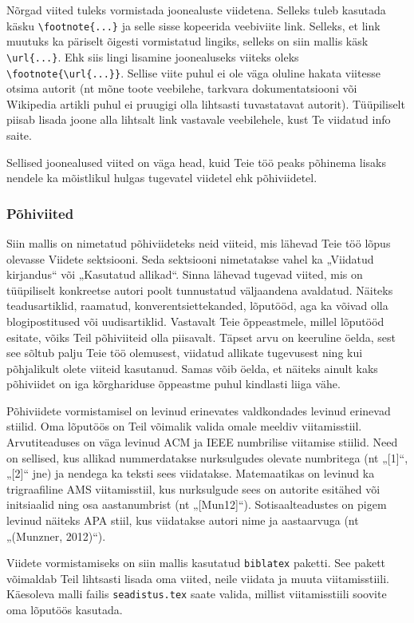 Nõrgad viited tuleks vormistada joonealuste viidetena. Selleks tuleb kasutada käsku \verb|\footnote{...}| ja selle sisse kopeerida veebiviite link. Selleks, et link muutuks ka päriselt õigesti vormistatud lingiks, selleks on siin mallis käsk \verb|\url{...}|. Ehk siis lingi lisamine joonealuseks viiteks oleks \verb|\footnote{\url{...}}|. Sellise viite puhul ei ole väga oluline hakata viitesse otsima autorit (nt mõne toote veebilehe, tarkvara dokumentatsiooni või Wikipedia artikli puhul ei pruugigi olla lihtsasti tuvastatavat autorit). Tüüpiliselt piisab lisada joone alla lihtsalt link vastavale veebilehele, kust Te viidatud info saite.

Sellised joonealused viited on väga head, kuid Teie töö peaks põhinema lisaks nendele ka mõistlikul hulgas tugevatel viidetel ehk põhiviidetel.

\subsubsection{Põhiviited}
Siin mallis on nimetatud põhiviideteks neid viiteid, mis lähevad Teie töö lõpus olevasse Viidete sektsiooni. Seda sektsiooni nimetatakse vahel ka „Viidatud kirjandus“ või „Kasutatud allikad“. Sinna lähevad tugevad viited, mis on tüüpiliselt konkreetse autori poolt tunnustatud väljaandena avaldatud. Näiteks teadusartiklid, raamatud, konverentsiettekanded, lõputööd, aga ka võivad olla blogipostitused või uudisartiklid. Vastavalt Teie õppeastmele, millel lõputööd esitate, võiks Teil põhiviiteid olla piisavalt. Täpset arvu on keeruline öelda, sest see sõltub palju Teie töö olemusest, viidatud allikate tugevusest ning kui põhjalikult olete viiteid kasutanud. Samas võib öelda, et näiteks ainult kaks põhiviidet on iga kõrghariduse õppeastme puhul kindlasti liiga vähe.

Põhiviidete vormistamisel on levinud erinevates valdkondades levinud erinevad stiilid. Oma lõputöös on Teil võimalik valida omale meeldiv viitamisstiil. Arvutiteaduses on väga levinud ACM ja IEEE numbrilise viitamise stiilid. Need on sellised, kus allikad nummerdatakse nurksulgudes olevate numbritega (nt „[1]“, „[2]“ jne) ja nendega ka teksti sees viidatakse. Matemaatikas on levinud ka trigraafiline AMS viitamisstiil, kus nurksulgude sees on autorite esitähed või initsiaalid ning osa aastanumbrist (nt „[Mun12]“). Sotisaalteadustes on pigem levinud näiteks APA stiil, kus viidatakse autori nime ja aastaarvuga (nt „(Munzner, 2012)“).

Viidete vormistamiseks on siin mallis kasutatud \verb|biblatex| paketti. See pakett võimaldab Teil lihtsasti lisada oma viited, neile viidata ja muuta viitamisstiili. Käesoleva malli failis \verb|seadistus.tex| saate valida, millist viitamisstiili soovite oma lõputöös kasutada.

